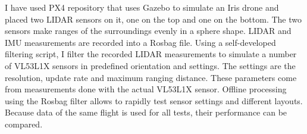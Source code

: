 I have used PX4 repository that uses Gazebo to simulate an Iris drone and placed two LIDAR sensors on it,
one on the top and one on the bottom. The two sensors make ranges of the surroundings evenly in a sphere 
shape. LIDAR and IMU measurements are recorded into a Rosbag file. 
Using a self-developed filtering script, I filter the recorded LIDAR measurements to simulate a number of 
VL53L1X sensors in predefined orientation and settings. The settings are the resolution, update rate and
maximum ranging distance. These parameters come from measurements done with the actual VL53L1X sensor.
Offline processing using the Rosbag filter allows to rapidly test sensor settings and different layouts. 
Because data of the same flight is used for all tests, their performance can be compared.











\vfill
\selectthesislanguage

\setcounter{romanPage}{\value{page}}
